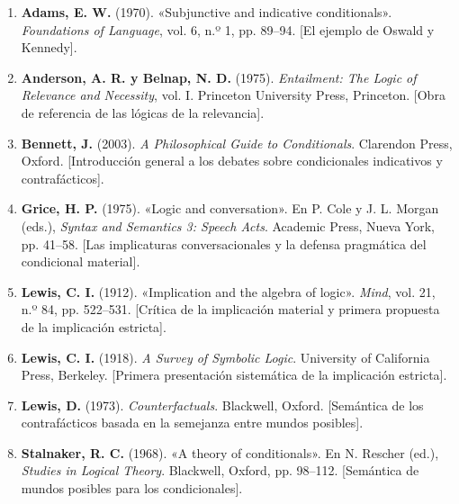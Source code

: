 \begin{enumerate}
    \item \textbf{Adams, E. W.} (1970). «Subjunctive and indicative conditionals». \emph{Foundations of Language}, vol. 6, n.º 1, pp. 89--94. [El ejemplo de Oswald y Kennedy].
    \item \textbf{Anderson, A. R. y Belnap, N. D.} (1975). \emph{Entailment: The Logic of Relevance and Necessity}, vol. I. Princeton University Press, Princeton. [Obra de referencia de las lógicas de la relevancia].
    \item \textbf{Bennett, J.} (2003). \emph{A Philosophical Guide to Conditionals}. Clarendon Press, Oxford. [Introducción general a los debates sobre condicionales indicativos y contrafácticos].
    \item \textbf{Grice, H. P.} (1975). «Logic and conversation». En P. Cole y J. L. Morgan (eds.), \emph{Syntax and Semantics 3: Speech Acts}. Academic Press, Nueva York, pp. 41--58. [Las implicaturas conversacionales y la defensa pragmática del condicional material].
    \item \textbf{Lewis, C. I.} (1912). «Implication and the algebra of logic». \emph{Mind}, vol. 21, n.º 84, pp. 522--531. [Crítica de la implicación material y primera propuesta de la implicación estricta].
    \item \textbf{Lewis, C. I.} (1918). \emph{A Survey of Symbolic Logic}. University of California Press, Berkeley. [Primera presentación sistemática de la implicación estricta].
    \item \textbf{Lewis, D.} (1973). \emph{Counterfactuals}. Blackwell, Oxford. [Semántica de los contrafácticos basada en la semejanza entre mundos posibles].
    \item \textbf{Stalnaker, R. C.} (1968). «A theory of conditionals». En N. Rescher (ed.), \emph{Studies in Logical Theory}. Blackwell, Oxford, pp. 98--112. [Semántica de mundos posibles para los condicionales].
\end{enumerate}

